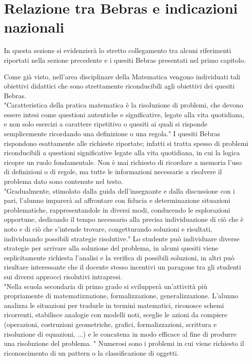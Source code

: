 \documentclass[12pt]{report}
\begin{document}
\section{Relazione tra Bebras e indicazioni nazionali}
In questa sezione si evidenzierà lo stretto collegamento tra alcuni riferimenti riportati nella sezione precedente e i quesiti Bebras presentati nel primo capitolo.

Come già visto, nell'area disciplinare della Matematica vengono individuati tali obiettivi didattici che sono strettamente riconducibili agli obiettivi dei quesiti Bebras.
\\

"Caratteristica della pratica matematica è la risoluzione di problemi, che devono essere intesi come questioni autentiche e significative, legate alla vita quotidiana, e non solo esercizi a carattere ripetitivo o quesiti ai quali si risponde semplicemente ricordando una definizione o una regola."
I quesiti Bebras rispondono esattamente alle richieste riportate; infatti si tratta spesso di problemi riconducibili a questioni significative legate alla vita quotidiana, in cui la logica ricopre un ruolo fondamentale. Non è mai richiesto di ricordare a memoria l’uso di definizioni o di regole, ma tutte le informazioni necessarie a risolvere il problema dato sono contenute nel testo.
\\

"Gradualmente, stimolato dalla guida dell'insegnante e dalla discussione con i pari, l’alunno imparerà ad affrontare con fiducia e determinazione situazioni problematiche, rappresentandole in diversi modi, conducendo le esplorazioni opportune, dedicando il tempo necessario alla precisa individuazione di ciò che è noto e di ciò che s’intende trovare, congetturando soluzioni e risultati, individuando possibili strategie risolutive."
Lo studente può individuare diverse strategie per arrivare alla soluzione del problema, in alcuni quesiti viene esplicitamente richiesta l’analisi e la verifica di possibili soluzioni, in altri può risultare interessante che il docente stesso incentivi un paragone tra gli studenti sui diversi approcci risolutivi intrapresi.
\\

"Nella scuola secondaria di primo grado si svilupperà un’attività più propriamente di matematizzazione, formalizzazione, generalizzazione. L’alunno analizza le situazioni per tradurle in termini matematici, riconosce schemi ricorrenti, stabilisce analogie con modelli noti, sceglie le azioni da compiere (operazioni, costruzioni geometriche, grafici, formalizzazioni, scrittura e risoluzione di equazioni, ...) e le concatena in modo efficace al fine di produrre una risoluzione del problema. "
Numerosi sono i problemi in cui viene richiesto il riconoscimento di un pattern o la classificazione di oggetti.
\\
\end{document}
